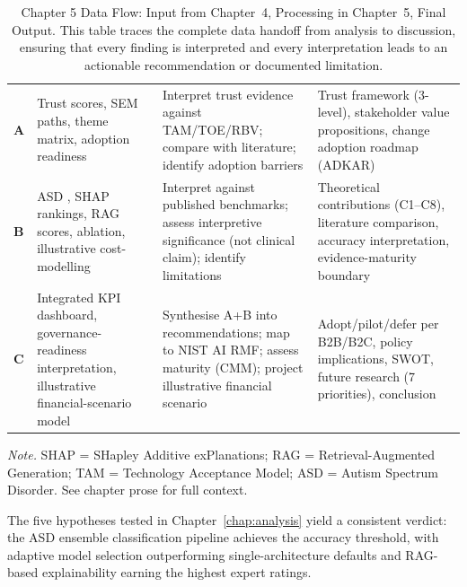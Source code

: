 {\tablestripes\tablefontsize
{}
\begin{xltabular}{\textwidth}{@{} >{\raggedright\arraybackslash}p{1.0cm} >{\raggedright\arraybackslash}p{4.0cm} p{4.7cm} p{4.5cm} @{}}
\caption[Chapter 5 Data Flow: Input from Chapter~4, Processing in]{Chapter 5 Data Flow: Input from Chapter~4, Processing in Chapter~5, Final Output. This table traces the complete data handoff from analysis to discussion, ensuring that every finding is interpreted and every interpretation leads to an actionable recommendation or documented limitation.}\label{tab:ch5_dataflow} \\
\toprule
{} &  &  &  \\
\midrule
\endfirsthead
\endhead
\bottomrule
\endlastfoot
\textbf{A} & Trust scores, SEM paths, theme matrix, adoption readiness & Interpret trust evidence against TAM/TOE/RBV; compare with literature; identify adoption barriers & Trust framework (3-level), stakeholder value propositions, change adoption roadmap (ADKAR) \\
\addlinespace
\textbf{B} & ASD \asdacc{}, SHAP rankings, RAG scores, ablation, illustrative cost-modelling & Interpret against published benchmarks; assess interpretive significance (not clinical claim); identify limitations & Theoretical contributions (C1--C8), literature comparison, accuracy interpretation, evidence-maturity boundary \\
\addlinespace
\textbf{C} & Integrated KPI dashboard, governance-readiness interpretation, illustrative financial-scenario model & Synthesise A+B into recommendations; map to NIST AI RMF; assess maturity (CMM); project illustrative financial scenario & Adopt/pilot/defer per B2B/B2C, policy implications, SWOT, future research (7 priorities), conclusion \\
\end{xltabular}}
\vspace{0.3em}\noindent\textit{Note.} SHAP = SHapley Additive exPlanations; RAG = Retrieval-Augmented Generation; TAM = Technology Acceptance Model; ASD = Autism Spectrum Disorder. See chapter prose for full context.

\noindent The five hypotheses tested in Chapter~\ref{chap:analysis} yield a consistent verdict: the ASD ensemble classification pipeline achieves the accuracy threshold, with adaptive model selection outperforming single-architecture defaults and RAG-based explainability earning the highest expert ratings.
\label{sec:ch5_h1}
\label{sec:ch5_h5}

